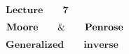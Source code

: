 \setcounter{section}{0}
\setcounter{equation}{0}
\newpage
\vspace*{\fill}
\begingroup
\thispagestyle{empty}
\begin{center}
    \fontsize{50pt}{0} $\mathbf{Lecture \qquad 7}$
    \par
    \fontsize{50pt}{0} $\mathbf{Moore \quad\quad\&\quad\quad Penrose}$
    \par
    \hspace*{-1cm}\fontsize{50pt}{0} $\mathbf{Generalized \qquad inverse}$
\end{center}
\endgroup
\vspace*{\fill}
\newpage